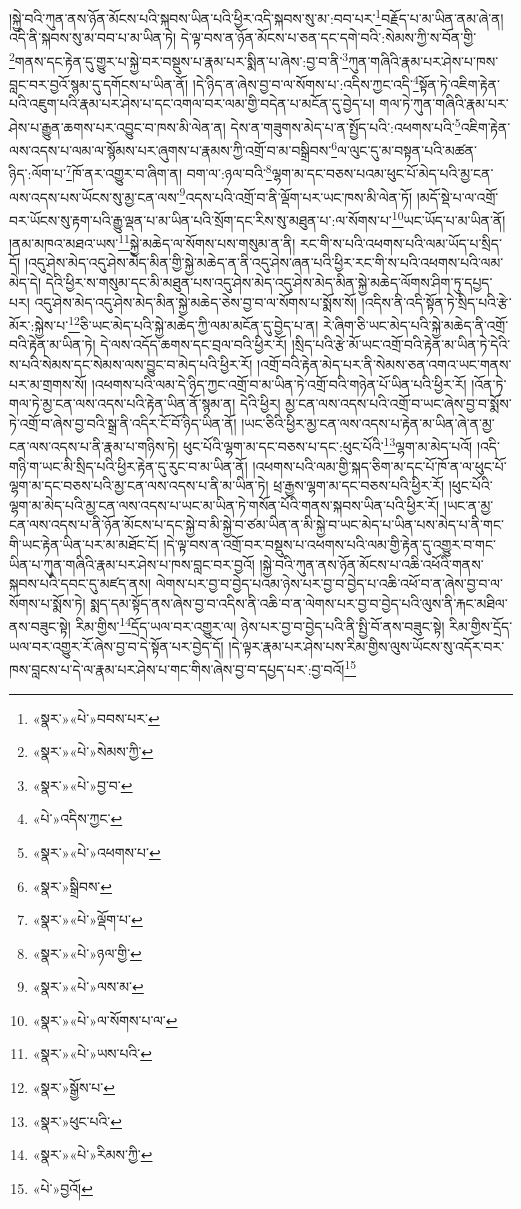།སྐྱེ་བའི་ཀུན་ནས་ཉོན་མོངས་པའི་སྐབས་ཡིན་པའི་ཕྱིར་འདི་སྐབས་སུ་མ་:བབ་པར་\footnote{«སྣར་»«པེ་»བབས་པར་}བརྗོད་པ་མ་ཡིན་ནམ་ཞེ་ན། འདི་ནི་སྐབས་སུ་མ་བབ་པ་མ་ཡིན་ཏེ། དེ་ལྟ་བས་ན་ཉོན་མོངས་པ་ཅན་དང་དགེ་བའི་:སེམས་ཀྱི་ས་བོན་གྱི་\footnote{«སྣར་»«པེ་»སེམས་ཀྱི་}གནས་དང་རྟེན་དུ་གྱུར་པ་སྐྱེ་བར་བསྡུས་པ་རྣམ་པར་སྨིན་པ་ཞེས་:བྱ་བ་ནི་\footnote{«སྣར་»«པེ་»བྱ་བ་}ཀུན་གཞིའི་རྣམ་པར་ཤེས་པ་ཁས་བླང་བར་བྱའོ་སྙམ་དུ་དགོངས་པ་ཡིན་ནོ། །དེ་ཉིད་ན་ཞེས་བྱ་བ་ལ་སོགས་པ་:འདིས་ཀྱང་འདི་\footnote{«པེ་»འདིས་ཀྱང་}སྟོན་ཏེ་འཇིག་རྟེན་པའི་འཇུག་པའི་རྣམ་པར་ཤེས་པ་དང་འགལ་བར་ལམ་གྱི་བདེན་པ་མངོན་དུ་བྱེད་པ། གལ་ཏེ་ཀུན་གཞིའི་རྣམ་པར་ཤེས་པ་རྒྱུན་ཆགས་པར་འབྱུང་བ་ཁས་མི་ལེན་ན། དེས་ན་གཟུགས་མེད་པ་ན་སྤྱོད་པའི་:འཕགས་པའི་\footnote{«སྣར་»«པེ་»འཕགས་པ་}འཇིག་རྟེན་ལས་འདས་པ་ལམ་ལ་སྙོམས་པར་ཞུགས་པ་རྣམས་ཀྱི་འགྲོ་བ་མ་བསྒྲིབས་\footnote{«སྣར་»སྒྲིབས་}ལ་ལུང་དུ་མ་བསྟན་པའི་མཚན་ཉིད་:ལོག་པ་\footnote{«སྣར་»«པེ་»ལྡོག་པ་}ཁོ་ནར་འགྱུར་བ་ཞིག་ན། བག་ལ་:ཉལ་བའི་\footnote{«སྣར་»«པེ་»ཉལ་གྱི་}ལྷག་མ་དང་བཅས་པའམ་ཕུང་པོ་མེད་པའི་མྱ་ངན་ལས་འདས་པས་ཡོངས་སུ་མྱ་ངན་ལས་\footnote{«སྣར་»«པེ་»ལས་མ་}འདས་པའི་འགྲོ་བ་ནི་ལྡོག་པར་ཡང་ཁས་མི་ལེན་ཏོ། །མདོ་སྡེ་པ་ལ་འགྲོ་བར་ཡོངས་སུ་རྟག་པའི་རྒྱུ་ལྡན་པ་མ་ཡིན་པའི་སྲོག་དང་རིས་སུ་མཐུན་པ་:ལ་སོགས་པ་\footnote{«སྣར་»«པེ་»ལ་སོགས་པ་ལ་}ཡང་ཡོད་པ་མ་ཡིན་ནོ། །ནམ་མཁའ་མཐའ་ཡས་\footnote{«སྣར་»«པེ་»ཡས་པའི་}སྐྱེ་མཆེད་ལ་སོགས་པས་གསུམ་ན་ནི། རང་གི་ས་པའི་འཕགས་པའི་ལམ་ཡོད་པ་སྲིད་དོ། །འདུ་ཤེས་མེད་འདུ་ཤེས་མེད་མིན་གྱི་སྐྱེ་མཆེད་ན་ནི་འདུ་ཤེས་ཞན་པའི་ཕྱིར་རང་གི་ས་པའི་འཕགས་པའི་ལམ་མེད་དེ། དེའི་ཕྱིར་ས་གསུམ་དང་མི་མཐུན་པས་འདུ་ཤེས་མེད་འདུ་ཤེས་མེད་མིན་སྐྱེ་མཆེད་ལོགས་ཤིག་ཏུ་དཔྱད་པར། འདུ་ཤེས་མེད་འདུ་ཤེས་མེད་མིན་སྐྱེ་མཆེད་ཅེས་བྱ་བ་ལ་སོགས་པ་སྨོས་སོ། །འདིས་ནི་འདི་སྟོན་ཏེ་སྲིད་པའི་རྩེ་མོར་:སྐྱེས་པ་\footnote{«སྣར་»སྒྱོས་པ་}ཅི་ཡང་མེད་པའི་སྐྱེ་མཆེད་ཀྱི་ལམ་མངོན་དུ་བྱེད་པ་ན། རེ་ཞིག་ཅི་ཡང་མེད་པའི་སྐྱེ་མཆེད་ནི་འགྲོ་བའི་རྟེན་མ་ཡིན་ཏེ། དེ་ལས་འདོད་ཆགས་དང་བྲལ་བའི་ཕྱིར་རོ། །སྲིད་པའི་རྩེ་མོ་ཡང་འགྲོ་བའི་རྟེན་མ་ཡིན་ཏེ་དེའི་ས་པའི་སེམས་དང་སེམས་ལས་བྱུང་བ་མེད་པའི་ཕྱིར་རོ། །འགྲོ་བའི་རྟེན་མེད་པར་ནི་སེམས་ཅན་འགའ་ཡང་གནས་པར་མ་གྲགས་སོ། །འཕགས་པའི་ལམ་དེ་ཉིད་ཀྱང་འགྲོ་བ་མ་ཡིན་ཏེ་འགྲོ་བའི་གཉེན་པོ་ཡིན་པའི་ཕྱིར་རོ། །འོན་ཏེ་གལ་ཏེ་མྱ་ངན་ལས་འདས་པའི་རྟེན་ཡིན་ནོ་སྙམ་ན། དེའི་ཕྱིར། མྱ་ངན་ལས་འདས་པའི་འགྲོ་བ་ཡང་ཞེས་བྱ་བ་སྨོས་ཏེ་འགྲོ་བ་ཞེས་བྱ་བའི་སྒྲ་ནི་འདིར་ངོ་བོ་ཉིད་ཡིན་ནོ། །ཡང་ཅིའི་ཕྱིར་མྱ་ངན་ལས་འདས་པ་རྟེན་མ་ཡིན་ཞེ་ན་མྱ་ངན་ལས་འདས་པ་ནི་རྣམ་པ་གཉིས་ཏེ། ཕུང་པོའི་ལྷག་མ་དང་བཅས་པ་དང་:ཕུང་པོའི་\footnote{«སྣར་»ཕུང་པའི་}ལྷག་མ་མེད་པའོ། །འདི་གཉི་ག་ཡང་མི་སྲིད་པའི་ཕྱིར་རྟེན་དུ་རུང་བ་མ་ཡིན་ནོ། །འཕགས་པའི་ལམ་གྱི་སྐད་ཅིག་མ་དང་པོ་ཁོ་ན་ལ་ཕུང་པོ་ལྷག་མ་དང་བཅས་པའི་མྱ་ངན་ལས་འདས་པ་ནི་མ་ཡིན་ཏེ། ཕྲ་རྒྱས་ལྷག་མ་དང་བཅས་པའི་ཕྱིར་རོ། །ཕུང་པོའི་ལྷག་མ་མེད་པའི་མྱ་ངན་ལས་འདས་པ་ཡང་མ་ཡིན་ཏེ་གསོན་པོའི་གནས་སྐབས་ཡིན་པའི་ཕྱིར་རོ། །ཡང་ན་མྱ་ངན་ལས་འདས་པ་ནི་ཉོན་མོངས་པ་དང་སྐྱེ་བ་མི་སྐྱེ་བ་ཙམ་ཡིན་ན་མི་སྐྱེ་བ་ཡང་མེད་པ་ཡིན་པས་མེད་པ་ནི་གང་གི་ཡང་རྟེན་ཡིན་པར་མ་མཐོང་ངོ། །དེ་ལྟ་བས་ན་འགྲོ་བར་བསྡུས་པ་འཕགས་པའི་ལམ་གྱི་རྟེན་དུ་འགྱུར་བ་གང་ཡིན་པ་ཀུན་གཞིའི་རྣམ་པར་ཤེས་པ་ཁས་བླང་བར་བྱའོ། །སྐྱེ་བའི་ཀུན་ནས་ཉོན་མོངས་པ་འཆི་འཕོའི་གནས་སྐབས་པའི་དབང་དུ་མཛད་ནས། ལེགས་པར་བྱ་བ་བྱེད་པའམ་ཉེས་པར་བྱ་བ་བྱེད་པ་འཆི་འཕོ་བ་ན་ཞེས་བྱ་བ་ལ་སོགས་པ་སྨོས་ཏེ། སྨད་དམ་སྟོད་ནས་ཞེས་བྱ་བ་འདིས་ནི་འཆི་བ་ན་ལེགས་པར་བྱ་བ་བྱེད་པའི་ལུས་ནི་རྐང་མཐིལ་ནས་བཟུང་སྟེ། རིམ་གྱིས་\footnote{«སྣར་»«པེ་»རིམས་ཀྱི་}དྲོད་ཡལ་བར་འགྱུར་ལ། ཉེས་པར་བྱ་བ་བྱེད་པའི་ནི་སྤྱི་བོ་ནས་བཟུང་སྟེ། རིམ་གྱིས་དྲོད་ཡལ་བར་འགྱུར་རོ་ཞེས་བྱ་བ་དེ་སྟོན་པར་བྱེད་དོ། །དེ་ལྟར་རྣམ་པར་ཤེས་པས་རིམ་གྱིས་ལུས་ཡོངས་སུ་འདོར་བར་ཁས་བླངས་པ་དེ་ལ་རྣམ་པར་ཤེས་པ་གང་གིས་ཞེས་བྱ་བ་དཔྱད་པར་:བྱ་བའོ།\footnote{«པེ་»བྱའོ།} 
